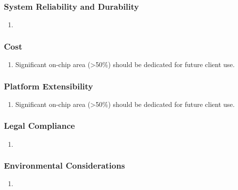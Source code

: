 \documentclass[10pt,letterpaper]{article}
\begin{document}
\subsubsection{System Reliability and Durability}
\begin{enumerate}[{NF.SR}.1:]
    \item 
\end{enumerate}

\subsubsection{Cost}
\begin{enumerate}[{NF.CT}.1:]
    \item Significant on-chip area (>50\%) should be dedicated for future client use.
\end{enumerate}

\subsubsection{Platform Extensibility}
\begin{enumerate}[{NF.PE}.1:]
    \item Significant on-chip area (>50\%) should be dedicated for future client use.
\end{enumerate}

\subsubsection{Legal Compliance}
\begin{enumerate}[{NF.LG}.1:]
    \item 
\end{enumerate}

\subsubsection{Environmental Considerations}
\begin{enumerate}[{NF.EN}.1:]
    \item 
\end{enumerate}


\clearpage
{}



\end{document}
